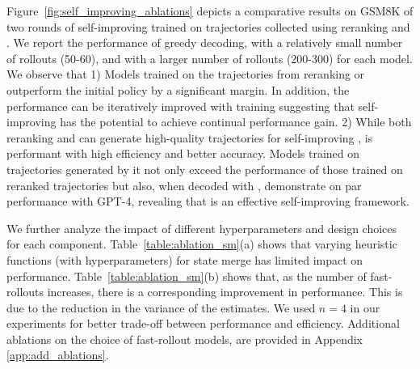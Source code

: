 



Figure~\ref{fig:self_improving_ablations} depicts a comparative results on GSM8K of two rounds of self-improving trained on trajectories collected using reranking and \emcts{}. We report the performance of greedy decoding, \emcts{} with a relatively small number of rollouts (50-60), and \emcts{} with a larger number of rollouts (200-300) for each model. We observe that 1) Models trained on the trajectories from reranking or \emcts{} outperform the initial policy by a significant margin. In addition, the performance can be iteratively improved with training suggesting that self-improving has the potential to achieve continual performance gain. 2) While both reranking and \emcts{} can generate high-quality trajectories for self-improving , \emcts{} is performant with high efficiency and better accuracy. Models trained on trajectories generated by it not only exceed the performance of those trained on reranked trajectories but also, when decoded with \emcts{}, demonstrate on par performance with GPT-4, revealing that \model{} is an effective self-improving framework.


We further analyze the impact of different hyperparameters and design choices for each component. Table~\ref{table:ablation_sm}(a) shows that varying heuristic functions (with hyperparameters) for state merge has limited impact on performance. Table~\ref{table:ablation_sm}(b) shows that, as the number of fast-rollouts increases, there is a corresponding improvement in performance. This is due to the reduction in the variance of the estimates. We used $n=4$ in our experiments for better trade-off between performance and efficiency. Additional ablations on the choice of fast-rollout models, are provided in Appendix \ref{app:add_ablations}.






